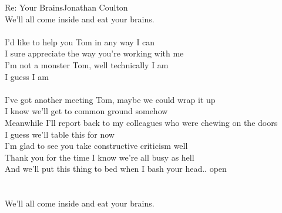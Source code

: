 \documentclass[a4paper,11pt]{article}
\begin{document}
\begin{song}{Re: Your Brains}{Jonathan Coulton}
\\
We'll all come inside and eat your brains.\\
\\
I'd like to help you Tom in any way I can\\
I sure appreciate the way you're working with me\\
I'm not a monster Tom, well technically I am\\
I guess I am\\
\\
 I've got another meeting Tom, maybe we could wrap it up \\
I know we'll get to common ground somehow \\
Meanwhile I'll report back to my colleagues who were chewing on the doors\\
 I guess we'll table this for now\\
I'm glad to see  you take constructive criticism well\\
Thank you for the time I know we're all busy as hell\\
And we'll put this thing to bed  when I bash your head.. open\\
\\
\\
We'll all come inside and eat your brains.\\


\end{song}
\end{document}
